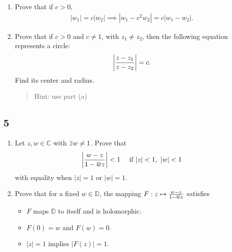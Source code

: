 \begin{enumerate}
\def\labelenumi{\alph{enumi}.}
\item
  Prove that if \(c>0\),
  \begin{align*}
  {\left\lvert {w_1} \right\rvert} = c{\left\lvert {w_2} \right\rvert} \implies {\left\lvert {w_1 - c^2 w_2} \right\rvert} = c{\left\lvert {w_1 - w_2} \right\rvert}
  .\end{align*}
\item
  Prove that if \(c>0\) and \(c\neq 1\), with \(z_1\neq z_2\), then the
  following equation represents a circle:
  \begin{align*}
   {\left\lvert {z-z_1 \over z-z_2} \right\rvert} = c
   .\end{align*}
  Find its center and radius.

  \begin{quote}
  Hint: use part (a)
  \end{quote}
\end{enumerate}

\hypertarget{section-25}{%
\subsection{5}\label{section-25}}

\begin{enumerate}
\def\labelenumi{\alph{enumi}.}
\item
  Let \(z, w \in {\mathbb{C}}\) with
  \(\mkern 1.5mu\overline{\mkern-1.5muz\mkern-1.5mu}\mkern 1.5mu w \neq 1\).
  Prove that
  \begin{align*}
   {\left\lvert {w-z \over 1 - \mkern 1.5mu\overline{\mkern-1.5muw\mkern-1.5mu}\mkern 1.5mu z} \right\rvert} < 1 \quad\text{ if } {\left\lvert {z} \right\rvert}<1,~ {\left\lvert {w} \right\rvert} < 1
   \end{align*}
  with equality when \({\left\lvert {z} \right\rvert} = 1\) or
  \({\left\lvert {w} \right\rvert} = 1\).
\item
  Prove that for a fixed \(w\in {\mathbb{D}}\), the mapping
  \(F: z\mapsto {w-z \over 1 - \mkern 1.5mu\overline{\mkern-1.5muw\mkern-1.5mu}\mkern 1.5mu z}\)
  satisfies

  \begin{itemize}
  \tightlist
  \item
    \(F\) maps \({\mathbb{D}}\) to itself and is holomorphic.
  \item
    \(F(0) = w\) and \(F(w) = 0\).
  \item
    \({\left\lvert {z} \right\rvert} = 1\) implies
    \({\left\lvert {F(z)} \right\rvert} = 1\).
  \end{itemize}
\end{enumerate}

